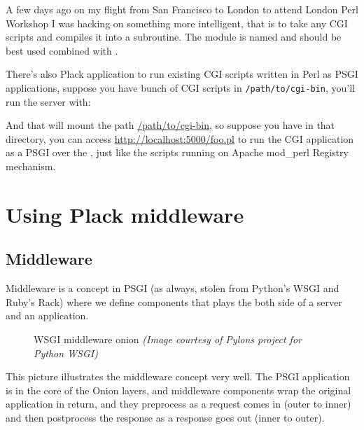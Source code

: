 A few days ago on my flight from San Francisco to London to attend
London Perl Workshop I was hacking on something more intelligent, that
is to take any CGI scripts and compiles it into a subroutine. The module
is named
\href{http://search.cpan.org/perldoc?CGI::Compile}{} and
should be best used combined with .


There's also
\href{http://search.cpan.org/perldoc?Plack::App::CGIBin}{}
Plack application to run existing CGI scripts written in Perl as PSGI
applications, suppose you have bunch of CGI scripts in
\lstinline!/path/to/cgi-bin!, you'll run the server with:


And that will mount the path \url{/path/to/cgi-bin}, so suppose
you have  in that directory, you can access
\url{http://localhost:5000/foo.pl} to run the CGI application as a PSGI over
the , just like the scripts running on Apache mod\_perl Registry
mechanism.

\chapter{Using Plack
middleware}\label{day-10-using-plack-middleware}

\section{Middleware}\label{middleware}

Middleware is a concept in PSGI (as always, stolen from Python's WSGI
and Ruby's Rack) where we define components that plays the both side of
a server and an application.

\begin{figure}[htbp]
\centering

\caption{WSGI middleware onion 
  \emph{(Image courtesy of Pylons project for Python WSGI)}}
\end{figure}

This picture illustrates the middleware concept very well. The PSGI
application is in the core of the Onion layers, and middleware
components wrap the original application in return, and they preprocess
as a request comes in (outer to inner) and then postprocess the response
as a response goes out (inner to outer).

